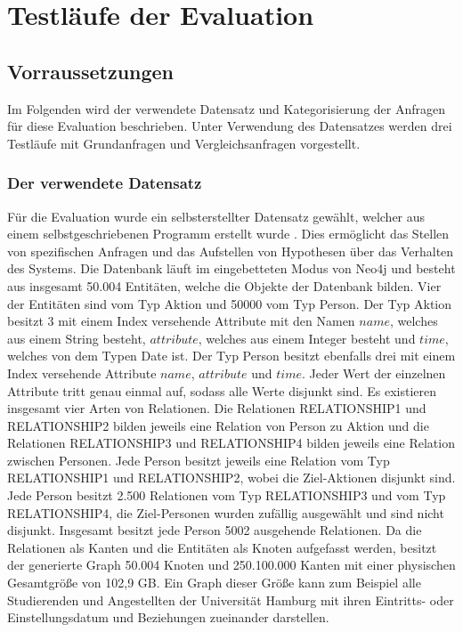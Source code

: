 
\chapter{Testläufe der Evaluation} %

\label{Kapitel3} %

\section{Vorraussetzungen}
Im Folgenden wird der verwendete Datensatz und Kategorisierung der Anfragen für diese Evaluation beschrieben. Unter Verwendung des Datensatzes werden drei Testläufe mit Grundanfragen und Vergleichsanfragen vorgestellt.  
\subsection{Der verwendete Datensatz}
Für die Evaluation wurde ein selbsterstellter Datensatz gewählt, welcher aus einem selbstgeschriebenen Programm erstellt wurde \parencite{Code}. Dies ermöglicht das Stellen von  spezifischen Anfragen und das Aufstellen von Hypothesen über das Verhalten des Systems. Die Datenbank läuft im eingebetteten Modus von Neo4j und besteht aus insgesamt 50.004 Entitäten, welche die Objekte der Datenbank bilden. Vier der Entitäten sind  vom Typ Aktion und 50000 vom Typ Person. Der Typ Aktion besitzt 3 mit einem Index versehende Attribute mit den Namen $name$, welches aus einem String besteht, $attribute$, welches aus einem Integer besteht und $time$, welches von dem Typen Date ist. Der Typ Person besitzt ebenfalls drei mit einem Index versehende Attribute $name$, $attribute$ und $time$. Jeder Wert der einzelnen Attribute tritt genau einmal auf, sodass alle Werte disjunkt sind. \newline
Es existieren insgesamt vier Arten von Relationen. Die Relationen RELATIONSHIP1 und RELATIONSHIP2 bilden jeweils eine Relation von Person zu Aktion und die Relationen RELATIONSHIP3 und RELATIONSHIP4 bilden jeweils eine Relation zwischen Personen. Jede Person besitzt jeweils eine Relation vom Typ RELATIONSHIP1 und RELATIONSHIP2, wobei die Ziel-Aktionen disjunkt sind. Jede Person besitzt 2.500 Relationen vom Typ RELATIONSHIP3 und vom Typ RELATIONSHIP4, die Ziel-Personen wurden zufällig ausgewählt und sind nicht disjunkt. Insgesamt besitzt jede Person 5002 ausgehende Relationen. Da die Relationen als Kanten und die Entitäten als Knoten aufgefasst werden, besitzt der generierte Graph 50.004 Knoten und 250.100.000 Kanten mit einer physischen Gesamtgröße von 102,9 GB. Ein Graph dieser Größe kann zum Beispiel alle Studierenden und Angestellten der Universität Hamburg mit ihren Eintritts- oder Einstellungsdatum und Beziehungen zueinander darstellen. 
